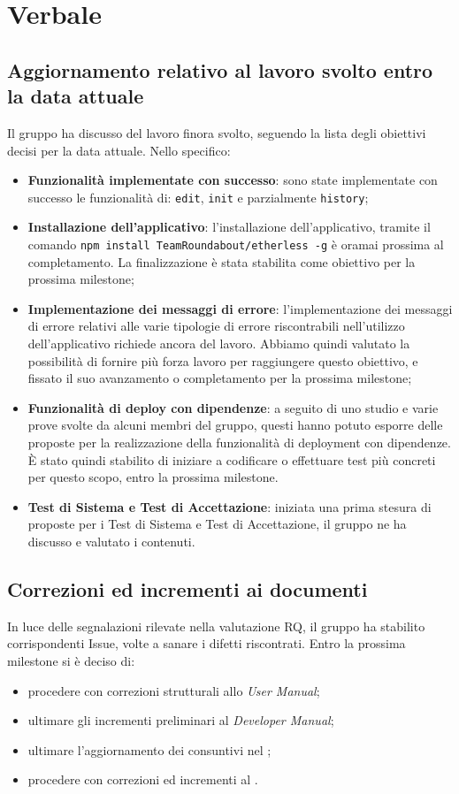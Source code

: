 \section{Verbale}

	\subsection{Aggiornamento relativo al lavoro svolto entro la data attuale}
	Il gruppo ha discusso del lavoro finora svolto, seguendo la lista degli obiettivi decisi per la data attuale. Nello specifico:
	\begin{itemize}
		\item \textbf{Funzionalità implementate con successo}: sono state implementate con successo le funzionalità di: \texttt{edit}, \texttt{init} e parzialmente \texttt{history}; 
		\item \textbf{Installazione dell'applicativo}: l'installazione dell'applicativo, tramite il comando \texttt{npm install TeamRoundabout/etherless -g} è oramai prossima al completamento. La finalizzazione è stata stabilita come obiettivo per la prossima milestone;
		\item \textbf{Implementazione dei messaggi di errore}: l'implementazione dei messaggi di errore relativi alle varie tipologie di errore riscontrabili nell'utilizzo dell'applicativo richiede ancora del lavoro. Abbiamo quindi valutato la possibilità di fornire più forza lavoro per raggiungere questo obiettivo, e fissato il suo avanzamento o completamento per la prossima milestone;
		\item \textbf{Funzionalità di deploy con dipendenze}: a seguito di uno studio e varie prove svolte da alcuni membri del gruppo, questi hanno potuto esporre delle proposte per la realizzazione della funzionalità di deployment con dipendenze. È stato quindi stabilito di iniziare a codificare o effettuare test più concreti per questo scopo, entro la prossima milestone.
		\item \textbf{Test di Sistema e Test di Accettazione}: iniziata una prima stesura di proposte per i Test di Sistema e Test di Accettazione, il gruppo ne ha discusso e valutato i contenuti.
	\end{itemize}
	\subsection{Correzioni ed incrementi ai documenti}
		In luce delle segnalazioni rilevate nella valutazione RQ, il gruppo ha stabilito corrispondenti Issue, volte a sanare i difetti riscontrati. Entro la prossima milestone si è deciso di:
		\begin{itemize}
			\item procedere con correzioni strutturali allo \textit{User Manual};
			\item ultimare gli incrementi preliminari al \textit{Developer Manual};
			\item ultimare l'aggiornamento dei consuntivi nel \PdP{};
			\item procedere con correzioni ed incrementi al \PdQ{}.
		\end{itemize}

